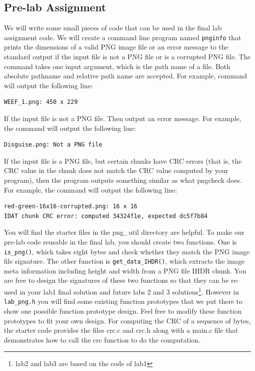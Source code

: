 \subsection{Pre-lab Assignment}
\label{sec:lab1_prelab_assignment}
We will write some small pieces of code that can be used in the final lab assignment code. We will create a command line program named \verb+pnginfo+ that prints the dimensions of a valid PNG image file or an error message to the standard output if the input file is not a PNG file or is a corrupted PNG file. The command takes one input argument, which is the path name of a file. Both absolute pathname and relative path name are accepted. For example, command  will output the following line: 
\begin{verbatim}
WEEF_1.png: 450 x 229 
\end{verbatim}
If the input file is not a PNG file. Then output an error message. For example, the command  will output the following line:
\begin{verbatim}
Disguise.png: Not a PNG file 
\end{verbatim}
If the input file is a PNG file, but certain chunks have CRC errors (that is, the CRC value in the chunk does not match the CRC value computed by your program), then the program outputs something similar as what pngcheck does. For example, the command  will output the following line:
\begin{verbatim}
red-green-16x16-corrupted.png: 16 x 16 
IDAT chunk CRC error: computed 34324f1e, expected dc5f7b84
\end{verbatim}

You will find the starter files in the png\_util directory are helpful. To make our pre-lab code reusable in the final lab, you should create two functions. One is \verb+is_png()+, which takes eight bytes and check whether they match the PNG image file signature. The other function is \verb+get_data_IHDR()+, which extracts the image meta information including height and width from a PNG file IHDR chunk. You are free to design the signatures of these two functions so that they can be re-used in your lab1 final solution and future labs 2 and 3 solutions\footnote{lab2 and lab3 are based on the code of lab1}. However in \verb+lab_png.h+ you will find some existing function prototypes that we put there to show one possible function prototype design. Feel free to modify these function prototypes to fit your own design. For computing the CRC of a sequence of bytes, the starter code provides the files crc.c and crc.h along with a main.c file that demonstrates how to call the crc function to do the computation.
